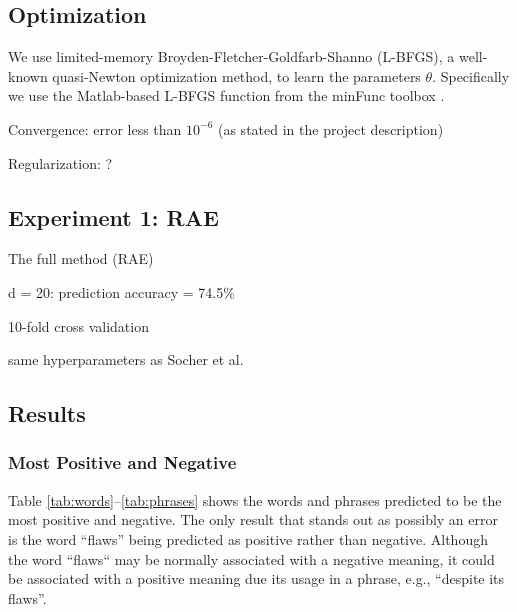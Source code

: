 \documentclass{article}
\begin{document}
%
%
\subsection{Optimization}
We use limited-memory Broyden-Fletcher-Goldfarb-Shanno (L-BFGS), a well-known quasi-Newton optimization method, to learn the parameters $\theta$. Specifically we use the Matlab-based L-BFGS function from the minFunc toolbox \cite{minFunc}.


Convergence: error less than $10^{-6}$ (as stated in the project description)

Regularization: ?


%
%
\subsection{Experiment 1: RAE}
The full method (RAE)

d = 20: prediction accuracy = 74.5\%

10-fold cross validation

same hyperparameters as Socher et al.




%
%
\subsection{Results}



\subsubsection{Most Positive and Negative}
Table \ref{tab:words}--\ref{tab:phrases} shows the words and phrases predicted to be the most positive and negative. The only result that stands out as possibly an error is the word ``flaws'' being predicted as positive rather than negative. Although the word ``flaws`` may be normally associated with a negative meaning, it could be associated with a positive meaning due its usage in a phrase, e.g., ``despite its flaws''.
\end{document}
